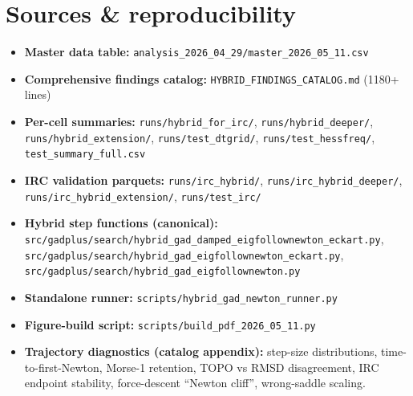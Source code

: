 \documentclass[11pt]{article}
\begin{document}
\section*{Sources \& reproducibility}

\begin{itemize}[leftmargin=1.5em, itemsep=0.05em]
\item \textbf{Master data table:} \texttt{analysis\_2026\_04\_29/master\_2026\_05\_11.csv}
\item \textbf{Comprehensive findings catalog:} \texttt{HYBRID\_FINDINGS\_CATALOG.md} (1180+ lines)
\item \textbf{Per-cell summaries:} \texttt{runs/hybrid\_for\_irc/}, \texttt{runs/hybrid\_deeper/}, \texttt{runs/hybrid\_extension/}, \texttt{runs/test\_dtgrid/}, \texttt{runs/test\_hessfreq/}, \texttt{test\_summary\_full.csv}
\item \textbf{IRC validation parquets:} \texttt{runs/irc\_hybrid/}, \texttt{runs/irc\_hybrid\_deeper/}, \texttt{runs/irc\_hybrid\_extension/}, \texttt{runs/test\_irc/}
\item \textbf{Hybrid step functions (canonical):}
  \texttt{src/gadplus/search/hybrid\_gad\_damped\_eigfollownewton\_eckart.py},
  \texttt{src/gadplus/search/hybrid\_gad\_eigfollownewton\_eckart.py},
  \texttt{src/gadplus/search/hybrid\_gad\_eigfollownewton.py}
\item \textbf{Standalone runner:} \texttt{scripts/hybrid\_gad\_newton\_runner.py}
\item \textbf{Figure-build script:} \texttt{scripts/build\_pdf\_2026\_05\_11.py}
\item \textbf{Trajectory diagnostics (catalog appendix):} step-size distributions,
  time-to-first-Newton, Morse-1 retention, TOPO vs RMSD disagreement,
  IRC endpoint stability, force-descent ``Newton cliff'', wrong-saddle
  scaling.
\end{itemize}
\end{document}
